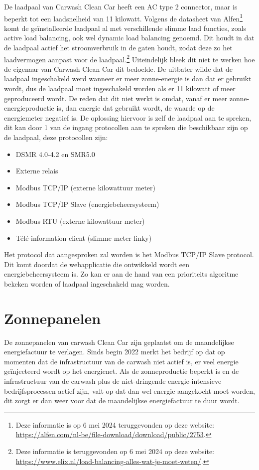 De laadpaal van Carwash Clean Car heeft een AC type 2 connector, maar is beperkt tot een laadsnelheid van 11 kilowatt. Volgens de datasheet van Alfen\footnote{Deze informatie is op 6 mei 2024 teruggevonden op deze website: \url{https://alfen.com/nl-be/file-download/download/public/2753}.} komt de geïnstalleerde laadpaal al met verschillende slimme laad functies, zoals active load balancing, ook wel dynamic load balancing genoemd. Dit houdt in dat de laadpaal actief het stroomverbruik in de gaten houdt, zodat deze zo het laadvermogen aanpast voor de laadpaal.\footnote{Deze informatie is teruggevonden op 6 mei 2024 op deze website: \url{https://www.elix.nl/load-balancing-alles-wat-je-moet-weten/}.} Uiteindelijk bleek dit niet te werken hoe de eigenaar van Carwash Clean Car dit bedoelde. De uitbater wilde dat de laadpaal ingeschakeld werd wanneer er meer zonne-energie is dan dat er gebruikt wordt, dus de laadpaal moet ingeschakeld worden als er 11 kilowatt of meer geproduceerd wordt. De reden dat dit niet werkt is omdat, vanaf er meer zonne-energieproductie is, dan energie dat gebruikt wordt, de waarde op de energiemeter negatief is. De oplossing hiervoor is zelf de laadpaal aan te spreken, dit kan door 1 van de ingang protocollen aan te spreken die beschikbaar zijn op de laadpaal, deze protocollen zijn:

\begin{itemize}
    \item DSMR 4.0-4.2 en SMR5.0
    \item Externe relais
    \item Modbus TCP/IP (externe kilowattuur meter)
    \item Modbus TCP/IP Slave (energiebeheersysteem)
    \item Modbus RTU (externe kilowattuur meter)
    \item Télé-information client (slimme meter linky)
\end{itemize}

Het protocol dat aangesproken zal worden is het Modbus TCP/IP Slave protocol. Dit komt doordat de webapplicatie die ontwikkeld wordt een energiebeheersysteem is. Zo kan er aan de hand van een prioriteits algoritme bekeken worden of laadpaal ingeschakeld mag worden.

\section{Zonnepanelen}
\label{sec:stand-van-zaken-zonnepanelen}

De zonnepanelen van carwash Clean Car zijn geplaatst om de maandelijkse energiefactuur te verlagen. Sinds begin 2022 merkt het bedrijf op dat op momenten dat de infrastructuur van de carwash niet actief is, er veel energie geïnjecteerd wordt op het energienet. Als de zonneproductie beperkt is en de infrastructuur van de carwash plus de niet-dringende energie-intensieve bedrijfsprocessen actief zijn, valt op dat dan wel energie aangekocht moet worden, dit zorgt er dan weer voor dat de maandelijkse energiefactuur te duur wordt.\\

